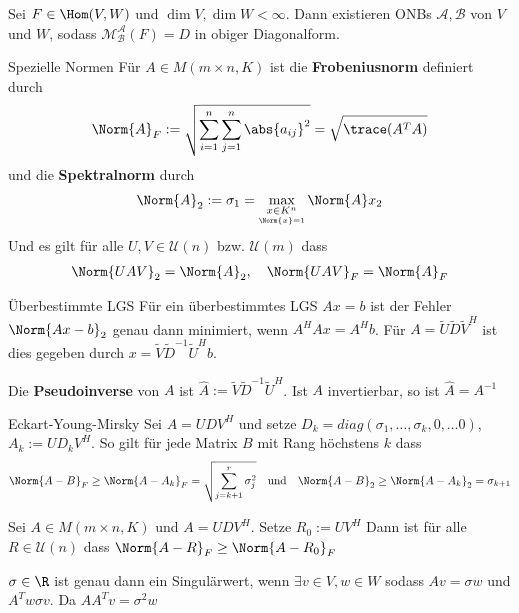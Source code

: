 \begin{nosatz}{}
    Sei $F \in \Hom(V,W)$ und $\dim V, \dim W < \infty$. Dann existieren ONBs $\mathcal{A}, \mathcal{B}$ von $V$ und $W$, sodass $\mathcal{M}_{\mathcal{B}}^{\mathcal{A}}(F) = D$ in obiger Diagonalform.
\end{nosatz}

\begin{definition}{Spezielle Normen}
    Für $A \in M(m\times n,K)$ ist die \textbf{Frobeniusnorm} definiert durch
    \begin{align*}
        \Norm{A}_F := \sqrt{
            \sum_{i = 1}^{n} \sum_{j = 1}^{n} \abs{a_{ij}}^2
        } = \sqrt{\trace(A^TA)}
    \end{align*}
    und die \textbf{Spektralnorm} durch
    \begin{align*}
        \Norm{A}_2 :=  \sigma_1 = \max_{\underset{\Norm{x} = 1}{x \in K^n}} \Norm{A}x_2
    \end{align*}
    Und es gilt für alle $U,V \in \mathcal{U}(n)$ bzw. $\mathcal{U}(m)$ dass
    \begin{align*}
        \Norm{UAV}_2 = \Norm{A}_2, \quad \Norm{UAV}_F = \Norm{A}_F
    \end{align*}
\end{definition}

\begin{satz}{Überbestimmte LGS}
    Für ein überbestimmtes LGS $Ax = b$ ist der Fehler $\Norm{Ax - b}_2$ genau dann minimiert, wenn $A^HAx = A^Hb$. Für $A = \tilde{U}\tilde{D} \tilde{V}^H$ ist dies gegeben durch $x = \tilde{V} \tilde{D}^{-1}\tilde{U}^Hb$.

    Die \textbf{Pseudoinverse} von $A$ ist $\hat{A} := \tilde{V} \tilde{D}^{-1}\tilde{U}^{H}$. Ist $A$ invertierbar, so ist $\hat{A} = A^{-1}$
\end{satz}

\begin{satz}{Eckart-Young-Mirsky}
    Sei $A = UDV^{H}$ und setze $D_k = diag(\sigma_{1}, \ldots, \sigma_{k}, 0, \ldots 0)$, $A_k := UD_kV^{H}$. So gilt für jede Matrix $B$ mit Rang höchstens $k$ dass 
    \begin{align*}
        \Norm{A - B}_F \geq \Norm{A - A_k}_F = \sqrt{\sum_{j = k+1}^{r}\sigma_j^2} \quad \text{und} \quad \Norm{A - B}_2 \geq \Norm{A - A_k}_2 = \sigma_{k+1}
    \end{align*}
\end{satz}

Sei $A  \in M(m\times n,K)$ und $A = UDV^{H}$. Setze $R_0 := UV^{H}$  Dann ist für alle $R \in \mathcal{U}(n)$ dass $\Norm{A-R}_F \geq \Norm{A - R_0}_F$

$\sigma \in \R$ ist genau dann ein Singulärwert, wenn $\exists v \in V, w \in W$ sodass $Av = \sigma w$ und $A^Tw  \sigma v$. Da $AA^Tv = \sigma^2 w$


